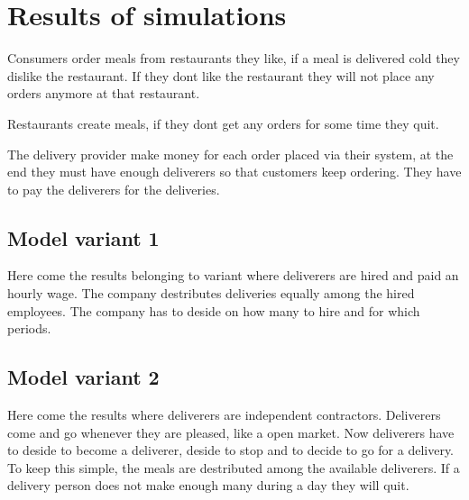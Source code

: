 \section{Results of simulations}


Consumers order meals from restaurants they like, if a meal is delivered cold they dislike the restaurant.
If they dont like the restaurant they will not place any orders anymore at that restaurant.

Restaurants create meals, if they dont get any orders for some time they quit.

The delivery provider make money for each order placed via their system, at the end they must have enough deliverers so that
customers keep ordering.
They have to pay the deliverers for the deliveries.



\subsection{Model variant 1}
Here come the results belonging to variant where deliverers are hired and paid an hourly wage.
The company destributes deliveries equally among the hired employees.
The company has to deside on how many to hire and for which periods.


\subsection{Model variant 2}
Here come the results where deliverers are independent contractors.
Deliverers come and go whenever they are pleased, like a open market.
Now deliverers have to deside to become a deliverer, deside to stop and to decide to go for a delivery.
To keep this simple, the meals are destributed among the available deliverers.
If a delivery person does not make enough many during a day they will quit.
